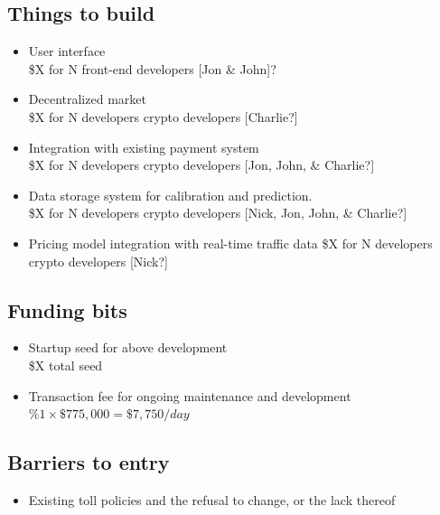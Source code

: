\documentclass[10pt, letter, twocolumn]{article} %
\begin{document}
\subsection{Things to build}
\begin{itemize}
    \item User interface\\
    \$X for N front-end developers [Jon \& John]?
    
    \item Decentralized market\\
    \$X for N developers crypto developers [Charlie?]
    
    \item Integration with existing payment system\\
    \$X for N developers crypto developers [Jon, John, \& Charlie?]
    
    \item Data storage system for calibration and prediction.\\
    \$X for N developers crypto developers [Nick, Jon, John, \& Charlie?]
    
    \item Pricing model integration with real-time traffic data
    \$X for N developers crypto developers [Nick?]
\end{itemize}

\subsection{Funding bits}
\begin{itemize}
    \item Startup seed for above development\\
    \$X total seed
    \item Transaction fee for ongoing maintenance and development\\
    $\%1 \times \$775,000=\$7,750/day$
\end{itemize}


\subsection{Barriers to entry}
\begin{itemize}
    \item Existing toll policies and the refusal to change, or the lack thereof
\end{itemize}


\printbibliography[title={Bibliography}] %

\end{document}
